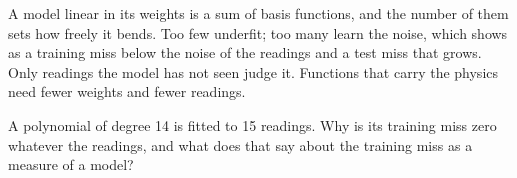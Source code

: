 \begin{keyidea}
A model linear in its weights is a sum of basis functions, and the
number of them sets how freely it bends. Too few underfit; too many
learn the noise, which shows as a training miss below the noise of the
readings and a test miss that grows. Only readings the model has not
seen judge it. Functions that carry the physics need fewer weights and
fewer readings.
\end{keyidea}


\begin{selfcheck}
A polynomial of degree 14 is fitted to 15 readings. Why is its training
miss zero whatever the readings, and what does that say about the
training miss as a measure of a model?
\end{selfcheck}
